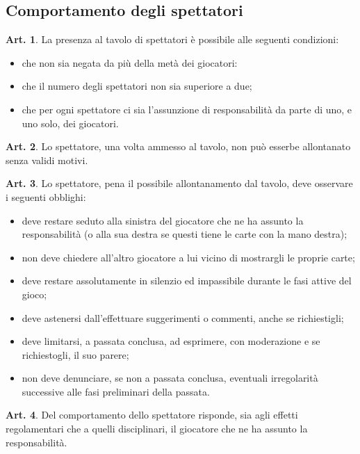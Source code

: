 \documentclass[italian,a4paper]{book}
\theoremstyle{definition}
\newtheorem{art}{Art.}
\newenvironment{packeditem}{
\begin{itemize}
  \setlength{\itemsep}{1pt}
  \setlength{\parskip}{0pt}
  \setlength{\parsep}{0pt}
}{\end{itemize}}
\begin{document}
\subsection{Comportamento degli spettatori}
\begin{art}
    La presenza al tavolo di spettatori è possibile alle seguenti condizioni:
    \begin{packeditem}
\item      che non sia negata da più della metà dei giocatori:
\item      che il numero degli spettatori non sia superiore a due;
\item      che per ogni spettatore ci sia l'assunzione di responsabilità da parte di uno, e uno solo, dei giocatori.
    \end{packeditem}
\end{art}
\begin{art}
    Lo spettatore, una volta ammesso al tavolo, non può esserbe allontanato senza validi motivi.
\end{art}
\begin{art}
    Lo spettatore, pena il possibile allontanamento dal tavolo, deve osservare i seguenti obblighi:
    \begin{packeditem}
\item      deve restare seduto alla sinistra del giocatore che ne ha assunto la responsabilità (o alla sua destra se questi tiene le carte con la mano destra);
\item      non deve chiedere all'altro giocatore a lui vicino di mostrargli le proprie carte;
\item      deve restare assolutamente in silenzio ed impassibile durante le fasi attive del gioco;
\item      deve astenersi dall'effettuare suggerimenti o commenti, anche se richiestigli;
\item      deve limitarsi, a passata conclusa, ad esprimere, con moderazione e se richiestogli, il suo parere;
\item        non deve denunciare, se non a passata conclusa, eventuali irregolarità successive alle fasi preliminari della passata.
    \end{packeditem}
\end{art}
\begin{art}
    Del comportamento dello spettatore risponde, sia agli effetti regolamentari che a quelli disciplinari, il giocatore che ne ha assunto la responsabilità.
\end{art}
\end{document}
